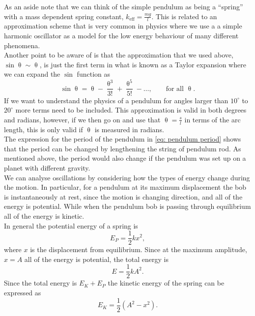 \documentclass[a4paper,12pt]{book}
\begin{document}
As an aside note that we can think of the simple pendulum as being a ``spring'' with a mass dependent spring constant, $k_{\text{eff}}=\frac{mg}{l}$. This is related to an approximation scheme that is very common in physics where we use a a simple harmonic oscillator as a model for the low energy behaviour of many different phenomena.\\

Another point to be aware of is that the approximation that we used above, $\sin\uptheta\sim\uptheta$, is just the first term in what is known as a Taylor expansion where we can expand the $\sin$ function as
\begin{equation*}
\sin\uptheta=\uptheta-\frac{\uptheta^{3}}{3!}+\frac{\uptheta^{5}}{5!}-\dots, \qquad \text{for all } \uptheta.
\end{equation*}
If we want to understand the physics of a pendulum for angles larger than $10^{\circ}$ to $20^{\circ}$ more terms need to be included. This approximation is valid in both degrees and radians, however, if we then go on and use that $\uptheta=\frac{s}{l}$ in terms of the arc length, this is only valid if $\uptheta$ is measured in radians.\\

The expression for the period of the pendulum in \cref{eq: pendulum period} shows that the period can be changed by lengthening the string of pendulum rod. As mentioned above, the period would also change if the pendulum was set up on a planet with different gravity.\\

We can analyse oscillations by considering how the types of energy change during the motion. In particular, for a pendulum at its maximum displacement the bob is instantaneously at rest, since the motion is changing direction, and all of the energy is potential. While when the pendulum bob is passing through equilibrium all of the energy is kinetic.\\

In general the potential energy of a spring is
\begin{equation*}
E_{P}=\frac{1}{2}kx^{2},
\end{equation*} 
where $x$ is the displacement from equilibrium. Since at the maximum amplitude, $x=A$ all of the energy is potential, the total energy is
\begin{equation*}
E=\frac{1}{2}kA^{2}.
\end{equation*}
Since the total energy is $E_{K}+E_{P}$ the kinetic energy of the spring can be expressed as
\begin{equation*}
E_{K}=\frac{1}{2}\left(A^{2}-x^{2}\right).
\end{equation*}
\end{document}
